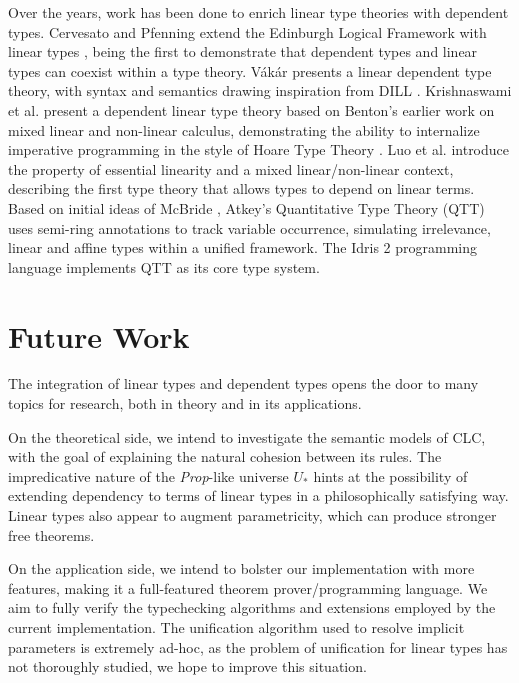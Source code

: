\documentclass[sigplan,screen]{acmart}
\theoremstyle{definition}
\begin{document}
  Over the years, work has been done to enrich linear type theories with dependent types. Cervesato and Pfenning extend the Edinburgh Logical Framework with linear types \cite{lf,llf}, being the first to demonstrate that dependent types and linear types can coexist within a type theory. V\'{a}k\'{a}r \cite{vakar14} presents a linear dependent type theory, with syntax and semantics drawing inspiration from DILL \cite{dill}.  Krishnaswami et al. present a dependent linear type theory \cite{neel15} based on Benton's earlier work on mixed linear and non-linear calculus, demonstrating the ability to internalize imperative programming in the style of Hoare Type Theory \cite{htt}. Luo et al. \cite{luo} introduce the property of essential linearity and a mixed linear/non-linear context, describing the first type theory that allows types to depend on linear terms. Based on initial ideas of McBride \cite{nothing}, Atkey's Quantitative Type Theory (QTT) \cite{qtt} uses semi-ring annotations to track variable occurrence, simulating irrelevance, linear and affine types within a unified framework. The Idris 2 programming language \cite{idris2} implements QTT as its core type system.
  
  \section{Future Work}
  The integration of linear types and dependent types opens the door to many topics for research, both in theory and in its applications.

  On the theoretical side, we intend to investigate the semantic models of CLC, with the goal of explaining the natural cohesion between its rules. The impredicative nature of the \textit{Prop}-like universe $U_*$ hints at the possibility of extending dependency to terms of linear types in a philosophically satisfying way. Linear types also appear to augment parametricity, which can produce stronger free theorems.

  On the application side, we intend to bolster our implementation with more features, making it a full-featured theorem prover/programming language. We aim to fully verify the typechecking algorithms and extensions employed by the current implementation. The unification algorithm used to resolve implicit parameters is extremely ad-hoc, as the problem of unification for linear types has not thoroughly studied, we hope to improve this situation.



\end{document}
